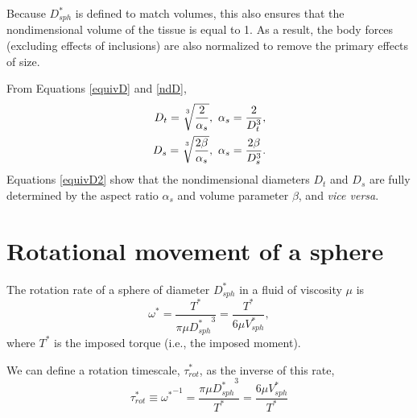 \documentclass[10pt,a4paper]{article}
\def\non{\nonumber}
\begin{document}
Because $D_{sph}^*$ is defined to match volumes, this also ensures that the nondimensional volume of the tissue is equal to 1.
As a result, the body forces (excluding effects of inclusions) are also normalized to remove the primary effects of size.


From Equations \ref{equivD} and \ref{ndD},
\begin{eqnarray}\label{equivD2}
	D_t = \sqrt[\uproot{5}3]{\frac{2}{\alpha_s}}, ~ \alpha_s = \frac{2}{D_t^3}, \non \\
	D_s = \sqrt[\uproot{5}3]{\frac{2 \beta}{\alpha_s}}, ~ \alpha_s = \frac{2 \beta}{D_s^3}.
\end{eqnarray}
Equations \ref{equivD2} show that the nondimensional diameters $D_t$ and $D_s$ are fully determined by the aspect ratio $\alpha_s$ and volume parameter $\beta$, and \textit{vice versa}.


\section{Rotational movement of a sphere}\label{RotSect}
The rotation rate of a sphere of diameter $D_{sph}^*$ in a fluid of viscosity $\mu$ is 
\begin{equation}\label{rot1}
	\omega^* = \frac{T^*}{\pi \mu {D_{sph}^*}^3} = \frac{T^*}{6 \mu V_{sph}^*},	
\end{equation}
where $T^*$ is the imposed torque (i.e., the imposed moment).

We can define a rotation timescale, $\tau_{rot}^*$, as the inverse of this rate,
\begin{equation}\label{tau1}
	\tau_{rot}^* \equiv {\omega^*}^{-1} = \frac{\pi \mu {D_{sph}^*}^3}{T^*} = \frac{6 \mu V_{sph}^*}{T^*}
\end{equation}
\end{document}
